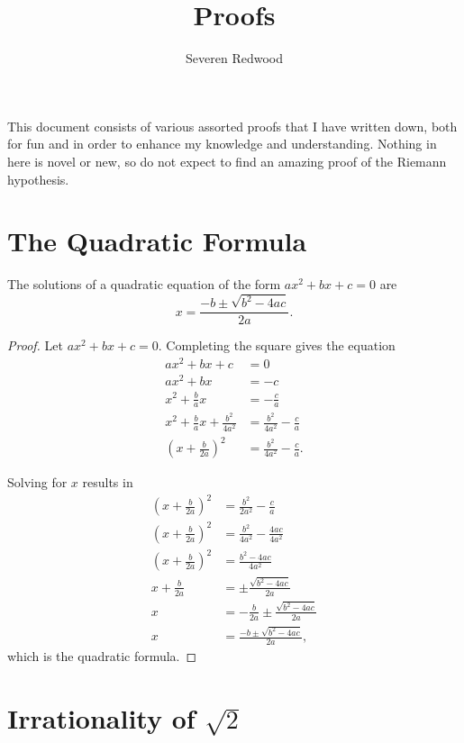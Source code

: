 \documentclass[parskip, headings=standardclasses]{scrartcl}
\title{Proofs}
\author{Severen Redwood}
\begin{document}
\maketitle

This document consists of various assorted proofs that I have written down, both
for fun and in order to enhance my knowledge and understanding. Nothing in here
is novel or new, so do not expect to find an amazing proof of the Riemann
hypothesis.

\section{The Quadratic Formula}

\begin{theorem}
  The solutions of a quadratic equation of the form \(ax^{2} + bx + c = 0\) are
  \[ x = \frac{-b ±\sqrt{b^{2} - 4ac}}{2a}. \]
\end{theorem}

\begin{proof}
  Let \(ax^{2} + bx + c = 0\). Completing the square gives the equation
  \begin{align*}
    ax^{2} + bx + c &= 0 \\
    ax^{2} + bx &= -c \\
    x^{2} + \frac{b}{a}x &= -\frac{c}{a} \\
    x^{2} + \frac{b}{a}x + \frac{b^{2}}{4a^{2}} &= \frac{b^{2}}{4a^{2}} - \frac{c}{a} \\
    {(x + \frac{b}{2a})}^{2} &= \frac{b^{2}}{4a^{2}} - \frac{c}{a}.
  \end{align*}

  Solving for \(x\) results in
  \begin{align*}
    {(x + \frac{b}{2a})}^{2} &= \frac{b^{2}}{2a^{2}} - \frac{c}{a} \\
    {(x + \frac{b}{2a})}^{2} &= \frac{b^{2}}{4a^{2}} - \frac{4ac}{4a^{2}} \\
    {(x + \frac{b}{2a})}^{2} &= \frac{b^{2} - 4ac}{4a^{2}} \\
    x + \frac{b}{2a} &= ±\frac{\sqrt{b^{2} - 4ac}}{2a} \\
    x &= -\frac{b}{2a} ±\frac{\sqrt{b^{2} - 4ac}}{2a} \\
    x &= \frac{-b ± \sqrt{b^{2} - 4ac}}{2a},
  \end{align*}
  which is the quadratic formula.
\end{proof}

\section{Irrationality of \(\sqrt{2}\)}
\end{document}
